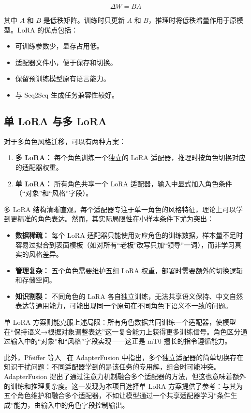 \documentclass[12pt,a4paper]{ctexart}
\begin{document}
\[
\Delta W = BA
\]

其中 $A$ 和 $B$ 是低秩矩阵。训练时只更新 $A$ 和 $B$，推理时将低秩增量作用于原模型。LoRA 的优点包括：

\begin{itemize}[leftmargin=2em]
  \item 可训练参数少，显存占用低。
  \item 适配器文件小，便于保存和切换。
  \item 保留预训练模型原有语言能力。
  \item 与 Seq2Seq 生成任务兼容性较好。
\end{itemize}

\subsection{单 LoRA 与多 LoRA}

对于多角色风格迁移，可以有两种方案：

\begin{enumerate}[leftmargin=2em]
  \item \textbf{多 LoRA：} 每个角色训练一个独立的 LoRA 适配器，推理时按角色切换对应的适配器权重。
  \item \textbf{单 LoRA：} 所有角色共享一个 LoRA 适配器，输入中显式加入角色条件（“对象”和“风格”字段）。
\end{enumerate}

多 LoRA 结构清晰直观，每个适配器专注于单一角色的风格特征，理论上可以学到更精准的角色表达。然而，其实际局限性在小样本条件下尤为突出：

\begin{itemize}[leftmargin=2em]
  \item \textbf{数据稀疏：} 每个 LoRA 适配器只能使用对应角色的训练数据，样本量不足时容易过拟合到表面模板（如对所有“老板”改写只加“领导”一词），而非学习真实的风格差异。
  \item \textbf{管理复杂：} 五个角色需要维护五组 LoRA 权重，部署时需要额外的切换逻辑和存储空间。
  \item \textbf{知识割裂：} 不同角色的 LoRA 各自独立训练，无法共享语义保持、中文自然表达等通用能力，可能出现同一个原句在不同角色下语义不一致的问题。
\end{itemize}

单 LoRA 方案则能克服上述局限：所有角色数据共同训练一个适配器，使模型在“保持语义→根据对象调整表达”这一复合能力上获得更多训练信号。角色区分通过输入中的“对象”和“风格”字段实现——这正是 mT0 擅长的指令遵循能力。

此外，Pfeiffer 等人~\cite{pfeiffer2021adapterfusion} 在 AdapterFusion 中指出，多个独立适配器的简单切换存在知识干扰问题：不同适配器学到的是该任务的专用解，组合时可能冲突。AdapterFusion 提出了通过注意力机制融合多个适配器的方法，但这也意味着额外的训练和推理复杂度。这一发现为本项目选择单 LoRA 方案提供了参考：与其为五个角色维护和融合多个适配器，不如让模型通过一个共享适配器学习“条件生成”能力，由输入中的角色字段控制输出。
\end{document}

